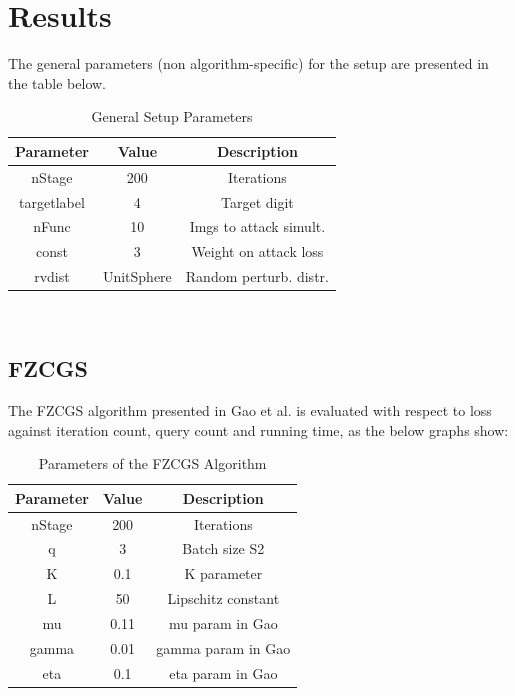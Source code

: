 \documentclass[10pt,twocolumn,letterpaper]{article}
\begin{document}
\section{Results}

The general parameters (non algorithm-specific) for the setup are presented in the table below.

\begin{table}[h]
   \centering
   \begin{tabular}{ccc}
       \hline
       Parameter & Value & Description \\
       \hline
       nStage & 200 & Iterations\\
       \hline
       targetlabel & 4 & Target digit\\
       \hline
       nFunc & 10 & Imgs to attack simult.\\
       \hline
       const & 3 & Weight on attack loss\\
       \hline
       rvdist & UnitSphere & Random perturb. distr.\\ 
       \hline
   \end{tabular}\\
   \caption{General Setup Parameters} 
   \label{tab:general_params}
\end{table}

\subsection{FZCGS}

The FZCGS algorithm presented in Gao et al. is evaluated with respect to 
loss against iteration count, query count and running time, as the below graphs show:

\begin{table}[h]
   \centering
   \begin{tabular}{ccc}
       \hline
       Parameter & Value & Description \\
       \hline
       nStage & 200 & Iterations\\
       \hline
       q & 3 & Batch size S2\\
       \hline
       K & 0.1 & K parameter\\
       \hline
       L & 50 & Lipschitz constant \\
       \hline
       mu & 0.11 & mu param in Gao\\
       \hline
       gamma & 0.01 & gamma param in Gao\\
       \hline
       eta & 0.1 & eta param in Gao\\
       \hline
   \end{tabular}\\
   \caption{Parameters of the FZCGS Algorithm} 
   \label{tab:fzcgs_params}
\end{table}
\end{document}
